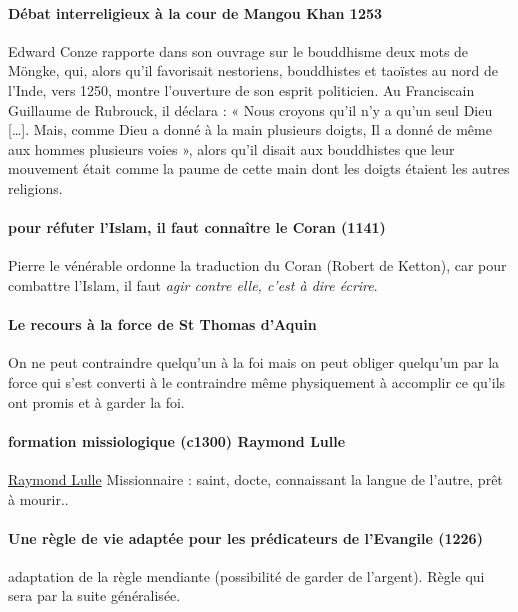 \paragraph{Débat interreligieux à la cour de Mangou Khan 1253}  Edward Conze rapporte dans son ouvrage sur le bouddhisme deux mots de Möngke, qui, alors qu'il favorisait nestoriens, bouddhistes et taoïstes au nord de l'Inde, vers 1250, montre l'ouverture de son esprit politicien. Au Franciscain Guillaume de Rubrouck, il déclara : « Nous croyons qu'il n'y a qu'un seul Dieu […]. Mais, comme Dieu a donné à la main plusieurs doigts, Il a donné de même aux hommes plusieurs voies », alors qu'il disait aux bouddhistes que leur mouvement était comme la paume de cette main dont les doigts étaient les autres religions.

\paragraph{pour réfuter l'Islam, il faut connaître le Coran (1141)} Pierre le vénérable ordonne la traduction du Coran (Robert de Ketton), car pour combattre l'Islam, il faut \textit{agir contre elle, c'est à dire écrire}.


\paragraph{Le recours à la force de St Thomas d'Aquin} On ne peut contraindre quelqu'un à la foi mais on peut obliger quelqu'un par la force qui s'est converti à le contraindre même physiquement à accomplir ce qu'ils ont promis et à garder la foi. 


\paragraph{formation missiologique (c1300) Raymond Lulle} \href{https://fr.wikipedia.org/wiki/Raymond_Lulle}{Raymond Lulle} Missionnaire : saint, docte, connaissant la langue de l'autre, prêt à mourir.. 

\paragraph{Une règle de vie adaptée pour les prédicateurs de l'Evangile (1226)} adaptation de la règle mendiante (possibilité de garder de l'argent). Règle qui sera par la suite généralisée.


